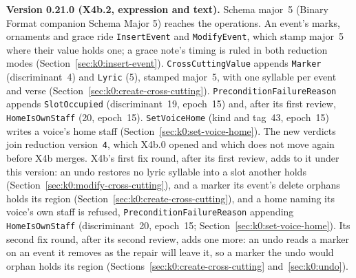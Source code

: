 \documentclass[11pt,letterpaper]{report}
\newcommand{\sectionsc}[1]{{\addfontfeatures{Letters=SmallCaps}#1}}
\begin{document}
\noindent\textbf{Version 0.21.0 (X4b.2, expression and text).} Schema
major~5 (Binary Format companion \sectionsc{Schema Major 5}) reaches the
operations. An event's marks, ornaments and grace ride \texttt{InsertEvent}
and \texttt{ModifyEvent}, which stamp major~5 where their value holds one; a
grace note's timing is ruled in both reduction modes
(Section~\ref{sec:k0:insert-event}). \texttt{CrossCuttingValue} appends
\texttt{Marker} (discriminant~4) and \texttt{Lyric} (5), stamped major~5,
with one syllable per event and verse
(Section~\ref{sec:k0:create-cross-cutting}).
\texttt{PreconditionFailureReason} appends \texttt{SlotOccupied}
(discriminant~19, epoch~15) and, after its first review,
\texttt{HomeIsOwnStaff} (20, epoch~15). \texttt{SetVoiceHome} (kind and tag~43,
epoch~15) writes a voice's home staff
(Section~\ref{sec:k0:set-voice-home}). The new verdicts join reduction
version~\texttt{4}, which X4b.0 opened and which does not move again before
X4b merges. X4b's first fix round, after its first review, adds to it under
this version: an undo restores no lyric syllable into a slot another holds
(Section~\ref{sec:k0:modify-cross-cutting}), and a marker its event's
delete orphans holds its region (Section~\ref{sec:k0:create-cross-cutting}), and
a home naming its voice's own staff is refused, \texttt{PreconditionFailureReason}
appending \texttt{HomeIsOwnStaff} (discriminant~20, epoch~15;
Section~\ref{sec:k0:set-voice-home}). Its second fix round, after its second
review, adds one more: an undo reads a marker on an event it removes as the
repair will leave it, so a marker the undo would orphan holds its region
(Sections~\ref{sec:k0:create-cross-cutting} and~\ref{sec:k0:undo}).
\end{document}
